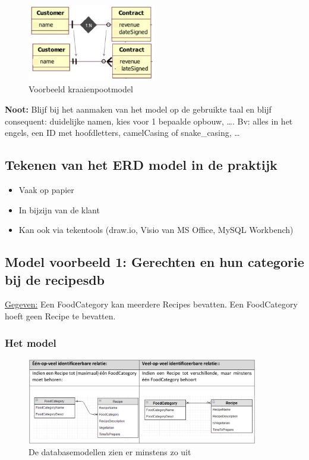 \documentclass{article}
\newcommand{\bold}[1]{\textbf{#1}}
\begin{document}
\begin{figure}[H]
    \centering
    \includegraphics[width=0.5\textwidth]{kraaienpootmodel-voorbeeld.png}
    \caption{Voorbeeld kraaienpootmodel}
\end{figure}

\bold{Noot:} Blijf bij het aanmaken van het model op de gebruikte taal en blijf consequent:
duidelijke namen, kies voor 1 bepaalde opbouw, \dots. Bv: alles in het engels, een ID met hoofdletters,
camelCasing of snake\_casing, \dots

\subsection{Tekenen van het ERD model in de praktijk}

\begin{itemize}
    \item Vaak op papier
    \item In bijzijn van de klant
    \item Kan ook via tekentools (draw.io, Visio van MS Office, MySQL Workbench)
\end{itemize}

\subsection{Model voorbeeld 1: Gerechten en hun categorie bij de recipesdb}

\underline{Gegeven:} Een FoodCategory kan meerdere Recipes bevatten. Een FoodCategory hoeft geen Recipe te bevatten.

\subsubsection{Het model}

\begin{figure}[H]
    \centering
    \includegraphics[width=0.9\textwidth]{Screenshot_20200401_134247.png}
    \caption{De databasemodellen zien er minstens zo uit}
\end{figure}
\end{document}
